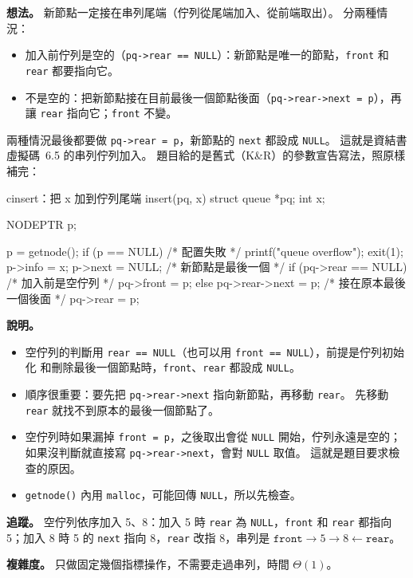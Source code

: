 \begin{pastsoln}
\textbf{想法。} 新節點一定接在串列尾端（佇列從尾端加入、從前端取出）。 分兩種情況：
\begin{itemize}
\item 加入前佇列是空的（\texttt{pq->rear == NULL}）：新節點是唯一的節點，\texttt{front} 和
\texttt{rear} 都要指向它。
\item 不是空的：把新節點接在目前最後一個節點後面（\texttt{pq->rear->next = p}），再讓
\texttt{rear} 指向它；\texttt{front} 不變。
\end{itemize}
兩種情況最後都要做 \texttt{pq->rear = p}，新節點的 \texttt{next} 都設成 \texttt{NULL}。
這就是資結書虛擬碼~6.5 的串列佇列加入。 題目給的是舊式（K\&R）的參數宣告寫法，照原樣補完：

\begin{code}{c}{insert：把 x 加到佇列尾端}
insert(pq, x)
struct queue *pq;
int x;
{
     NODEPTR p;

     p = getnode();
     if (p == NULL) {                 /* 配置失敗 */
         printf("queue overflow\n");
         exit(1);
     }
     p->info = x;
     p->next = NULL;                  /* 新節點是最後一個 */
     if (pq->rear == NULL)            /* 加入前是空佇列 */
         pq->front = p;
     else
         pq->rear->next = p;          /* 接在原本最後一個後面 */
     pq->rear = p;
}
\end{code}

\textbf{說明。}
\begin{itemize}
\item 空佇列的判斷用 \texttt{rear == NULL}（也可以用 \texttt{front == NULL}），前提是佇列初始化
和刪除最後一個節點時，\texttt{front}、\texttt{rear} 都設成 \texttt{NULL}。
\item 順序很重要：要先把 \texttt{pq->rear->next} 指向新節點，再移動 \texttt{rear}。 先移動
\texttt{rear} 就找不到原本的最後一個節點了。
\item 空佇列時如果漏掉 \texttt{front = p}，之後取出會從 \texttt{NULL} 開始，佇列永遠是空的；
如果沒判斷就直接寫 \texttt{pq->rear->next}，會對 \texttt{NULL} 取值。 這就是題目要求檢查的原因。
\item \texttt{getnode()} 內用 \texttt{malloc}，可能回傳 \texttt{NULL}，所以先檢查。
\end{itemize}

\textbf{追蹤。} 空佇列依序加入 5、8：加入 5 時 \texttt{rear} 為 \texttt{NULL}，\texttt{front} 和
\texttt{rear} 都指向 5；加入 8 時 5 的 \texttt{next} 指向 8，\texttt{rear} 改指 8，串列是
$\texttt{front} \to 5 \to 8 \leftarrow \texttt{rear}$。

\textbf{複雜度。} 只做固定幾個指標操作，不需要走過串列，時間 $\Theta(1)$。
\end{pastsoln}
